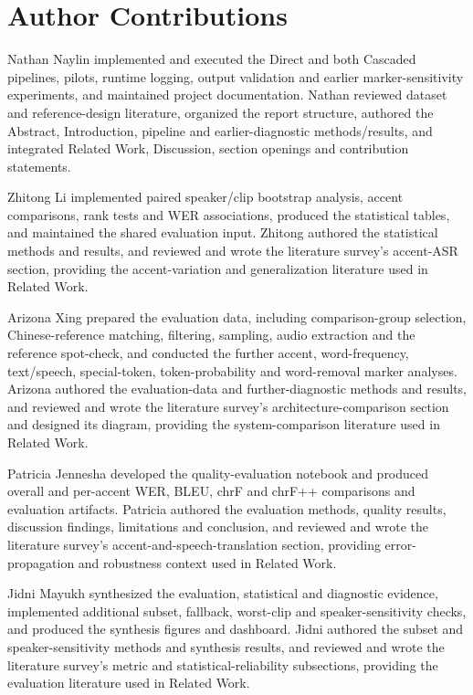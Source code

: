 \section*{Author Contributions}

Nathan Naylin implemented and executed the Direct and both Cascaded pipelines,
pilots, runtime logging, output validation and earlier marker-sensitivity
experiments, and maintained project documentation.
Nathan reviewed dataset and reference-design literature, organized the report
structure, authored the Abstract, Introduction, pipeline and earlier-diagnostic
methods/results, and integrated Related Work, Discussion, section openings and
contribution statements.

Zhitong Li implemented paired speaker/clip bootstrap analysis, accent
comparisons, rank tests and WER associations, produced the statistical tables,
and maintained the shared evaluation input.
Zhitong authored the statistical methods and results, and reviewed and wrote the
literature survey's accent-ASR section, providing
the accent-variation and generalization literature used in Related Work.

Arizona Xing prepared the evaluation data, including comparison-group selection,
Chinese-reference matching, filtering, sampling, audio extraction and the
reference spot-check, and conducted the further accent, word-frequency,
text/speech, special-token, token-probability and word-removal marker analyses.
Arizona authored the evaluation-data and further-diagnostic methods and results,
and reviewed and wrote the literature survey's architecture-comparison section
and designed its diagram, providing the system-comparison literature used in
Related Work.

Patricia Jennesha developed the quality-evaluation notebook and produced
overall and per-accent WER, BLEU, chrF and chrF++ comparisons and evaluation
artifacts.
Patricia authored the evaluation methods, quality results, discussion findings,
limitations and conclusion, and reviewed and wrote the literature survey's
accent-and-speech-translation section, providing error-propagation and robustness
context used in Related Work.

Jidni Mayukh synthesized the evaluation, statistical and diagnostic evidence,
implemented additional subset, fallback, worst-clip and speaker-sensitivity
checks, and produced the synthesis figures and dashboard.
Jidni authored the subset and speaker-sensitivity methods and synthesis results,
and reviewed and wrote the literature survey's metric and statistical-reliability
subsections, providing the evaluation literature used in Related Work.
